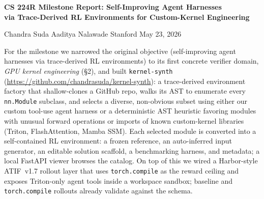 \documentclass[10pt]{article}
\date{}
\newcommand{\milesec}[1]{\par\vspace{0.20em}\noindent{\large\bfseries #1}\par\vspace{0.02em}}
\begin{document}
\begin{center}
  {\large\bfseries CS 224R Milestone Report: Self-Improving Agent Harnesses\\ via Trace-Derived RL Environments for Custom-Kernel Engineering\par}
  \vspace{3pt}
  {\small Chandra Suda \quad Aaditya Nalawade \quad\textbar\quad Stanford \quad\textbar\quad May 23, 2026\par}
\end{center}
\vspace{-0.6em}
\linespread{0.92}\selectfont

\milesec{1.\ Experiments so far}
For the milestone we narrowed the original objective (self-improving agent harnesses via trace-derived RL environments) to its first concrete verifier domain, \emph{GPU kernel engineering} (\S2), and built \texttt{kernel-synth} (\url{https://github.com/chandrasuda/kernel-synth}): a trace-derived environment factory that shallow-clones a GitHub repo, walks its AST to enumerate every \texttt{nn.Module} subclass, and selects a diverse, non-obvious subset using either our custom tool-use agent harness or a deterministic AST heuristic favoring modules with unusual forward operations or imports of known custom-kernel libraries (Triton, FlashAttention, Mamba SSM). Each selected module is converted into a self-contained RL environment: a frozen reference, an auto-inferred input generator, an editable solution scaffold, a benchmarking harness, and metadata; a local FastAPI viewer browses the catalog. On top of this we wired a Harbor-style ATIF~v1.7 rollout layer that uses \texttt{torch.compile} as the reward ceiling and exposes Triton-only agent tools inside a workspace sandbox; baseline and \texttt{torch.compile} rollouts already validate against the schema.
\end{document}
